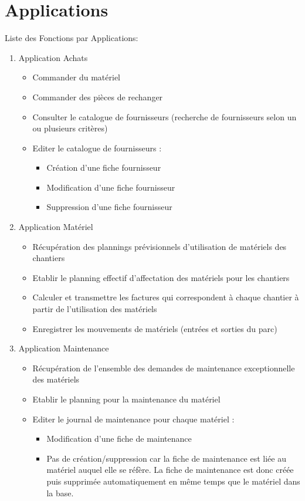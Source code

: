 \documentclass [a4paper] {report}
\begin{document}
\section{Applications}

Liste des Fonctions par Applications:

\begin{enumerate}

\item Application Achats
\begin{itemize}
\item Commander du matériel
\item Commander des pièces de rechanger
\item Consulter le catalogue de fournisseurs (recherche de fournisseurs selon 
un ou plusieurs critères)
\item Editer le catalogue de fournisseurs :
	\begin{itemize}
	\item Création d'une fiche fournisseur
	\item Modification d'une fiche fournisseur
	\item Suppression d'une fiche fournisseur
	\end{itemize}
\end{itemize}

\item Application Matériel
\begin{itemize}
\item Récupération des plannings prévisionnels d'utilisation de matériels des chantiers
\item Etablir le planning effectif d'affectation des matériels pour les chantiers
\item Calculer et transmettre les factures qui correspondent à chaque chantier
à partir de l'utilisation des matériels
\item Enregistrer les mouvements de matériels (entrées et sorties du parc)
\end{itemize}

\item Application Maintenance
\begin{itemize}
\item Récupération de l'ensemble des demandes de maintenance exceptionnelle des matériels
\item Etablir le planning pour la maintenance du matériel
\item Editer le journal de maintenance pour chaque matériel :
    \begin{itemize}
    \item Modification d'une fiche de maintenance
    \item Pas de création/suppression car la fiche de maintenance est liée
    au matériel auquel elle se réfère. La fiche de maintenance est donc
    créée puis supprimée automatiquement en même temps que le matériel dans
    la base.
    \end{itemize}
\end{itemize}


\end{enumerate}
\end{document}
